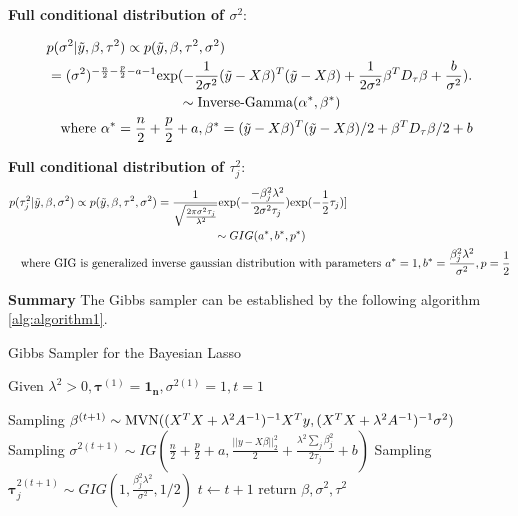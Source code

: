 \textbf{Full conditional distribution of $\sigma^2$}:

\begin{equation}
	\begin{multlined}
		p(\sigma^2|\tilde{y},\beta,\tau^2) \propto  	p(\tilde{y},\beta,\tau^2,\sigma^2)  \\
		= (\sigma^2)^{-\frac{n}{2}-\frac{p}{2}-a-1}\textnormal{exp}(-\frac{1}{2\sigma^2}(\tilde{y}-X\beta)^T(\tilde{y}-X\beta)+\frac{1}{2\sigma^2}\beta^TD_{\tau}\beta+\frac{b}{\sigma^2}).\\
		\sim \textnormal{Inverse-Gamma}(\alpha^*,\beta^*)\\
		\textnormal{where } \alpha^* = \frac{n}{2}+\frac{p}{2}+a, \beta^* = 
		(\tilde{y}-X\beta)^T(\tilde{y}-X\beta)/2 + \beta^TD_{\tau}\beta/2 +b
	\end{multlined}
\end{equation}

\textbf{Full conditional distribution of $\tau_j^2$}:
\begin{equation}
	\begin{multlined}
		p(\tau_j^2|\tilde{y},\beta,\sigma^2) \propto  	p(\tilde{y},\beta,\tau^2,\sigma^2)  
		= \frac{1}{\sqrt{\frac{2\pi\sigma^2\tau_j}{\lambda^2}}}\textnormal{exp}(-\frac{-\beta_j^2\lambda^2}{2\sigma^2\tau_j})\textnormal{exp}(-\frac{1}{2}\tau_j)]\\
		\sim GIG(a^*,b^*,p^*)\\
		\textnormal{where GIG is generalized inverse gaussian distribution with parameters } a^* = 1, b^* = \frac{\beta_j^2\lambda^2}{\sigma^2}, p = \frac{1}{2}
	\end{multlined}
\end{equation}

\textbf{Summary}
The Gibbs sampler can be established by the following algorithm \autoref{alg:algorithm1}.
\begin{algorithm}
	\caption{Gibbs Sampler for the Bayesian Lasso}
	\begin{algorithmic}[1]
		
		\State Given $\lambda^2>0, \mathbf{\tau}^{(1)} = \mathbf{1_n}, \sigma^{2(1)} =1 , t=1$ 
		
		\State Sampling $\mathbf{\beta}^{(t+1)} \sim \textnormal{MVN}((X^TX+\lambda^2A^{-1})^{-1}X^Ty,(X^TX+\lambda^2A^{-1})^{-1}\sigma^2) $  
		\State Sampling $\sigma^{2(t+1)} \sim IG(\frac{n}{2}+\frac{p}{2}+a,\frac{||y-X\beta||_2^2}{2}+\frac{\lambda^2\sum_j{\beta_j^2}}{2\tau_j}+b)$ 
		\State Sampling $\mathbf{\tau}_j^{2(t+1)} \sim GIG(1,\frac{\beta_j^2\lambda^2}{\sigma^2},1/2)$ 
		\EndFor
		\State $t \leftarrow t + 1$
		\EndWhile  \label{roy's loop}
		\State return $\beta,\sigma^2,\tau^2$
		
		
	\end{algorithmic}
	\label{alg:algorithm1}
\end{algorithm}

